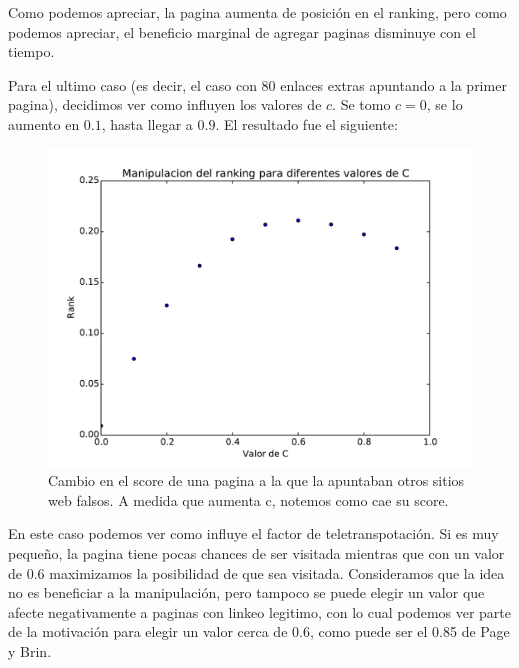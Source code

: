 Como podemos apreciar, la pagina aumenta de posición en el ranking, pero como podemos apreciar, el beneficio marginal de agregar paginas disminuye con el tiempo.

Para el ultimo caso (es decir, el caso con 80 enlaces extras apuntando a la primer pagina), decidimos ver como influyen los valores de $c$. Se tomo $c = 0$, se lo aumento en $0.1$, hasta llegar a $0.9$. El resultado fue el siguiente:

\begin{figure}[H]
\centering
\includegraphics[scale=0.7]{images/manipulacionC.pdf}
\caption{Cambio en el score de una pagina a la que la apuntaban otros sitios web falsos. A medida que aumenta c, notemos como cae su score.}
\label{timePageRank}
\end{figure}

En este caso podemos ver como influye el factor de teletranspotación. Si es muy pequeño, la pagina tiene pocas chances de ser visitada mientras que con un valor de 0.6 maximizamos la posibilidad de que sea visitada. Consideramos que la idea no es beneficiar a la manipulación, pero tampoco se puede elegir un valor que afecte negativamente a paginas con linkeo legitimo, con lo cual podemos ver parte de la motivación para elegir un valor cerca de 0.6, como puede ser el 0.85 de Page y Brin.
